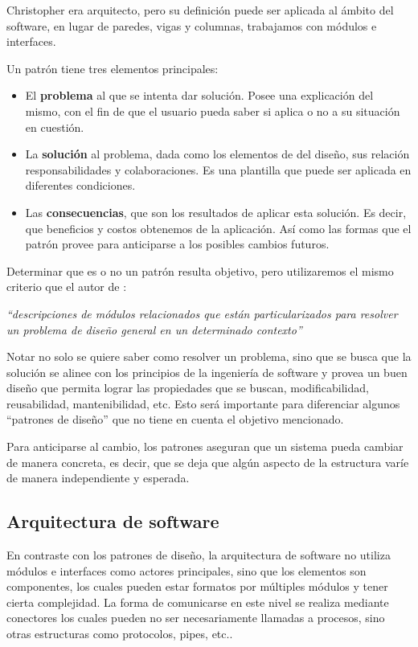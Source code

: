 Christopher era arquitecto, pero su definición puede ser aplicada al ámbito del software, en lugar de paredes, vigas y columnas, trabajamos con módulos e interfaces.

Un patrón tiene tres elementos principales:

\begin{itemize}
	\item El \textbf{problema} al que se intenta dar solución. Posee una explicación del mismo, con el fin de que el usuario pueda saber si aplica o no a su situación en cuestión.
	\item La \textbf{solución} al problema, dada como los elementos de del diseño, sus relación responsabilidades y colaboraciones. Es una plantilla que puede ser aplicada en diferentes condiciones.
	\item Las \textbf{consecuencias}, que son los resultados de aplicar esta solución. Es decir, que beneficios y costos obtenemos de la aplicación. Así como las formas que el patrón provee para anticiparse a los posibles cambios futuros.
\end{itemize}

Determinar que es o no un patrón resulta objetivo, pero utilizaremos el mismo criterio que el autor de \cite{Gamma:1995:DPE:186897}:

\textit{``descripciones de módulos relacionados que están particularizados para resolver un problema de diseño general en un determinado contexto''}

Notar no solo se quiere saber como resolver un problema, sino que se busca que la solución se alinee con los principios de la ingeniería de software y provea un buen diseño que permita lograr las propiedades que se buscan, modificabilidad, reusabilidad, mantenibilidad, etc. Esto será importante para diferenciar algunos ``patrones de diseño'' que no tiene en cuenta el objetivo mencionado.

Para anticiparse al cambio, los patrones aseguran que un sistema pueda cambiar de manera concreta, es decir, que se deja que algún aspecto de la estructura varíe de manera independiente y esperada.


\subsection{Arquitectura de software}
\label{secArq}

En contraste con los patrones de diseño, la arquitectura de software no utiliza módulos e interfaces como actores principales, sino que los elementos son componentes, los cuales pueden estar formatos por múltiples módulos y tener cierta complejidad. La forma de comunicarse en este nivel se realiza mediante conectores los cuales pueden no ser necesariamente llamadas a procesos, sino otras estructuras como protocolos, pipes, etc..

